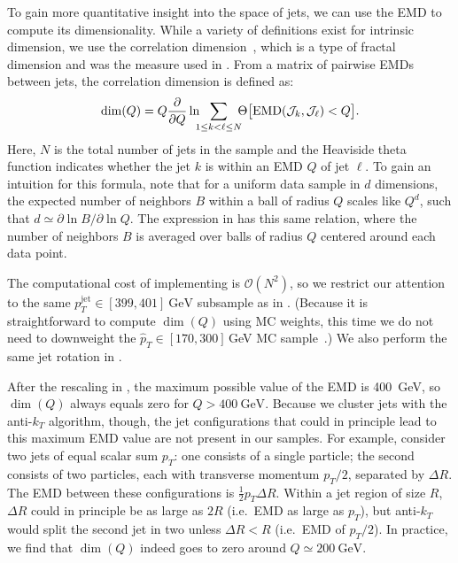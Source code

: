 \documentclass[aps,prd,twocolumn,preprintnumbers,nofootinbib,longbibliography,floatfix,superscriptaddress]{revtex4-1}
\begin{document}
To gain more quantitative insight into the space of jets, we can use the EMD to compute its dimensionality.
%
While a variety of definitions exist for intrinsic dimension, we use the correlation dimension~\cite{Grassberger:1983zz,DBLP:conf/nips/Kegl02}, which is a type of fractal dimension and was the measure used in .
%
From a matrix of pairwise EMDs between jets, the correlation dimension is defined as:
\begin{equation}
\label{eq:corrdim}
\dim(Q) = Q\frac{\partial}{\partial Q}\ln\hspace{-0.5em}\sum_{1\le k < \ell \le N}\hspace{-0.5em}\Theta\big[\text{EMD}(\mathcal J_k, \mathcal J_\ell) < Q\big].
\end{equation}
%
Here, $N$ is the total number of jets in the sample and the Heaviside theta function indicates whether the jet $k$ is within an EMD $Q$ of jet $\ell$.
%
To gain an intuition for this formula, note that for a uniform data sample in $d$ dimensions, the expected number of neighbors $B$ within a ball of radius $Q$ scales like $Q^d$, such that $d \simeq \partial \ln B / \partial \ln Q$.
%
The expression in  has this same relation, where the number of neighbors $B$ is averaged over balls of radius $Q$ centered around each data point.


The computational cost of implementing  is $\mathcal{O}(N^2)$, so we restrict our attention to the same $p_T^\text{jet}\in[399,401]~\text{GeV}$ subsample as in .
%
(Because it is straightforward to compute $\dim(Q)$ using MC weights, this time we do not need to downweight the $\hat{p}_T \in [170,300]$\,GeV MC sample~\cite{CMS:QCDsim170-300}.)
%
We also perform the same jet rotation in .


After the rescaling in , the maximum possible value of the EMD is \SI{400}{\GeV}, so $\dim(Q)$ always equals zero for $Q > \SI{400}{\GeV}$.
%
Because we cluster jets with the anti-$k_T$ algorithm, though, the jet configurations that could in principle lead to this maximum EMD value are not present in our samples.
%
For example, consider two jets of equal scalar sum $p_T$: one consists of a single particle; the second consists of two particles, each with transverse momentum $p_T/2$, separated by $\Delta R$.
%
The EMD between these configurations is $\frac{1}{2} p_T \Delta R$.
%
Within a jet region of size $R$, $\Delta R$ could in principle be as large as $2R$ (i.e.~EMD as large as $p_T$), but anti-$k_T$ would split the second jet in two unless $\Delta R < R$ (i.e.~EMD of $p_T/2$).
%
In practice, we find that $\dim(Q)$ indeed goes to zero around $Q \simeq \SI{200}{\GeV}$.
\end{document}
